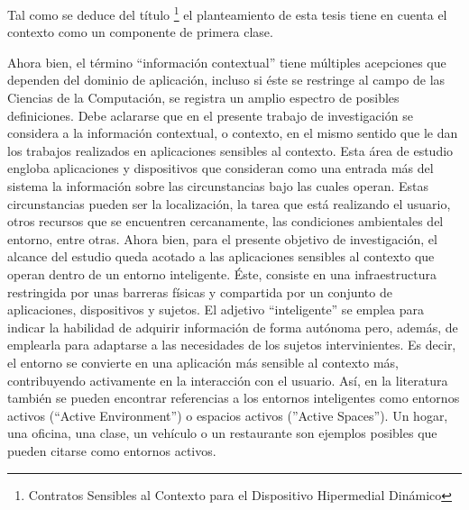 Tal como se deduce del título \footnote{Contratos Sensibles al Contexto
para el Dispositivo Hipermedial Dinámico} el planteamiento de esta tesis
tiene en cuenta el contexto como un componente de primera clase.

Ahora bien, el término “información contextual” tiene múltiples acepciones
que dependen del dominio de aplicación, incluso si éste se restringe al campo de
las Ciencias de la Computación, se registra un amplio espectro de posibles
definiciones. Debe aclararse que en el presente trabajo de investigación se considera a la información contextual, o contexto,  en el mismo
sentido que le dan los trabajos realizados en aplicaciones sensibles al
contexto. Esta área de estudio engloba aplicaciones y dispositivos que consideran como una entrada más del sistema la información sobre las circunstancias bajo las cuales
operan. Estas circunstancias pueden ser la localización, la tarea que está
realizando el usuario, otros recursos que se encuentren cercanamente, las
condiciones ambientales del entorno, entre otras. 
Ahora bien,  para el presente objetivo de investigación, el alcance del estudio queda acotado a las aplicaciones sensibles al contexto
que operan dentro de un entorno inteligente. Éste, consiste en una
infraestructura restringida por unas barreras físicas y compartida por un
conjunto de aplicaciones, dispositivos y sujetos. El adjetivo “inteligente” se
emplea para indicar la habilidad de adquirir información de forma autónoma pero, además, de emplearla para adaptarse a las necesidades de los sujetos intervinientes. Es decir, el entorno se convierte en una aplicación más sensible al contexto más, contribuyendo
activamente en la interacción con el usuario. Así, en la literatura también se
pueden encontrar referencias a los entornos inteligentes como entornos activos
(“Active Environment”) o espacios activos (''Active Spaces''). Un
hogar, una oficina, una clase, un vehículo o un restaurante son ejemplos
posibles que pueden citarse como entornos activos. 

